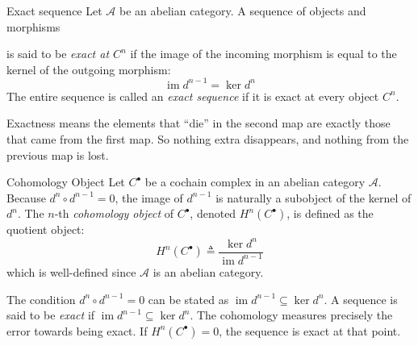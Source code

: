 \documentclass[a4paper]{article}
\begin{document}
\begin{snippetdefinition}{Exact sequence}
    Let \(\mathcal A\) be an abelian category. A sequence of objects and morphisms
    \begin{center}
    \end{center}
    is said to be \emph{exact at \(C^n\)} if the image of the incoming morphism is equal to the kernel of the outgoing morphism:
    \[
        \operatorname{im} d^{n-1} = \ker d^n
    \]
    The entire sequence is called an \emph{exact sequence} if it is exact at every object \(C^n\).
\end{snippetdefinition}

Exactness means the elements that ``die'' in the second map are exactly those that came from the first map.
So nothing extra disappears, and nothing from the previous map is lost.

\begin{snippetdefinition}{Cohomology Object}
    Let \(C^\bullet\) be a cochain complex in an abelian category \(\mathcal A\).
    Because \(d^{n} \circ d^{n-1} = 0\), the image of \(d^{n-1}\) is naturally a subobject of the kernel of \(d^n\). 
    The \(n\)-th \emph{cohomology object} of \(C^\bullet\), denoted \(H^n(C^\bullet)\), is defined as the quotient object:
    \[
        H^n(C^\bullet) \triangleq \frac{\ker d^n}{\operatorname{im} d^{n-1}}
    \]
    which is well-defined since \(\mathcal A\) is an abelian category.
\end{snippetdefinition}

The condition \(d^{n} \circ d^{n-1} = 0\)
can be stated as \(\operatorname{im} d^{n-1} \subseteq \ker d^n\).
A sequence is said to be \emph{exact} if \(\operatorname{im} d^{n-1} \subseteq \ker d^n\).
The cohomology measures precisely the error towards being exact.
If \(H^n(C^\bullet) = 0\), the sequence is exact at that point.
\end{document}
